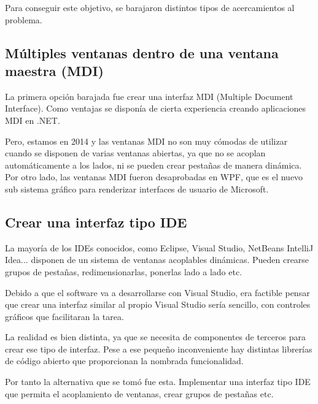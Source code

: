 Para conseguir este objetivo, se barajaron distintos tipos de acercamientos al problema.

\subsection{M\'ultiples ventanas dentro de una ventana maestra (MDI)}
La primera opci\'on barajada fue crear una interfaz MDI (Multiple Document Interface). Como ventajas se
dispon\'ia de cierta experiencia creando aplicaciones MDI en .NET.

Pero, estamos en 2014 y las ventanas MDI no son muy c\'omodas de utilizar cuando se disponen de varias ventanas
abiertas, ya que no se acoplan autom\'aticamente a los lados, ni se pueden crear pesta\~nas de manera din\'amica.
Por otro lado, las ventanas MDI fueron desaprobadas en WPF, que es el nuevo sub sistema gr\'afico para renderizar 
interfaces de usuario de Microsoft.

\subsection{Crear una interfaz tipo IDE}
La mayor\'ia de los IDEs conocidos, como Eclipse, Visual Studio, NetBeans IntelliJ Idea... disponen de un sistema de 
ventanas acoplables din\'amicas. Pueden crearse grupos de pesta\~nas, redimensionarlas, ponerlas lado a lado etc.

Debido a que el software va a desarrollarse con Visual Studio, era factible pensar que crear una interfaz similar al propio
Visual Studio ser\'ia sencillo, con controles gr\'aficos que facilitaran la tarea.

La realidad es bien distinta, ya que se necesita de componentes de terceros para crear ese tipo de interfaz. Pese a ese
peque\~no inconveniente hay distintas librer\'ias de c\'odigo abierto que proporcionan la nombrada funcionalidad.

Por tanto la alternativa que se tom\'o fue esta. Implementar una interfaz tipo IDE que permita el acoplamiento de ventanas,
crear grupos de pesta\~nas etc.